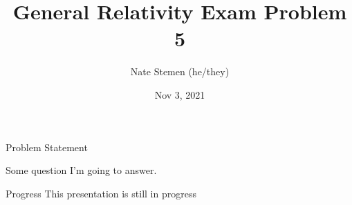\documentclass[aspectratio=1610,xcolor=dvipsnames,mathserif]{beamer}
\title{General Relativity Exam Problem 5}
\date{Nov 3, 2021}
\author{Nate Stemen (he/they)}
\institute{AMATH 875}
\newcommand{\problemstatement}{Some question I'm going to answer.}
\begin{document}
\maketitle

\begin{frame}{Problem Statement}
	\large
	\begin{prob}
		\problemstatement
	\end{prob}
\end{frame}

\begin{frame}{Progress}
	\Huge This presentation is still in progress
\end{frame}
\end{document}
